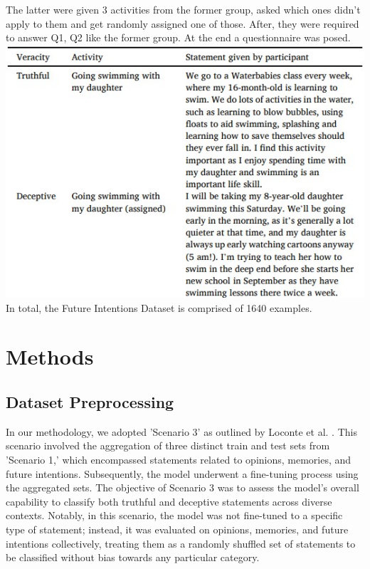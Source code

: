 \documentclass[10pt,twocolumn,letterpaper]{article}
\begin{document}
The latter were given 3 activities from the former group, asked which ones didn’t apply to them and get 
randomly assigned one of those. After, they were required to answer Q1, Q2 like the former group.
At the end a questionnaire was posed. \\

\includegraphics[scale=0.65]{img/future_intentions_dataset.jpg} \\

In total, the Future Intentions Dataset is comprised of 1640 examples.

\section{Methods}

\subsection{Dataset Preprocessing}

In our methodology, we adopted 'Scenario 3' as outlined by Loconte et al. \cite{Loconte}. 
This scenario involved the aggregation of three distinct train and test sets from 'Scenario 1,' 
which encompassed statements related to opinions, memories, and future intentions. Subsequently, 
the model underwent a fine-tuning process using the aggregated sets. 
The objective of Scenario 3 was to assess the model's overall capability to classify both truthful and deceptive 
statements across diverse contexts. Notably, in this scenario, the model was not fine-tuned to a specific type 
of statement; instead, it was evaluated on opinions, memories, and future intentions collectively, 
treating them as a randomly shuffled set of statements to be classified without bias towards any particular category. \\
\end{document}
